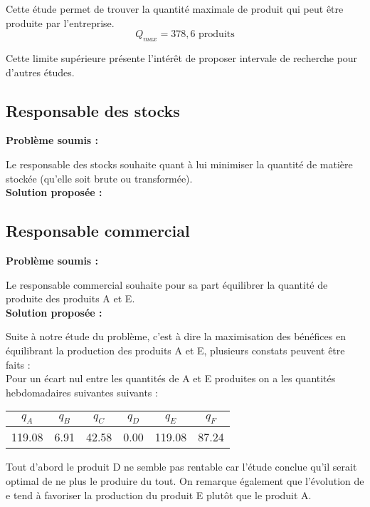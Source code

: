 \documentclass[paper=a4, fontsize=11pt]{scrartcl}
\numberwithin{equation}{section}		%
\numberwithin{figure}{section}			%
\numberwithin{table}{section}				%
\renewcommand{\bf}[1]{\textbf{#1}}
\begin{document}
Cette étude permet de trouver la quantité maximale de produit qui peut être produite par l'entreprise.
\[ Q_{max} = 378,6 \text{ produits}\]

Cette limite supérieure présente l'intérêt de proposer intervale de recherche pour d'autres études.


\subsection{Responsable des stocks}
\bf{Problème soumis :}

Le responsable des stocks souhaite quant à lui minimiser la quantité de matière stockée (qu'elle soit brute ou transformée).\\

\bf{Solution proposée :}

\subsection{Responsable commercial}
\bf{Problème soumis :}

Le responsable commercial souhaite pour sa part équilibrer la quantité de produite des produits A et E.\\

\bf{Solution proposée :}

Suite à notre étude du problème, c'est à dire la maximisation des bénéfices en équilibrant la production des produits A et E, plusieurs constats peuvent être faits :\\
Pour un écart nul entre les quantités de A et E produites on a les quantités hebdomadaires suivantes suivants :
\begin{center}
\begin{tabular}{cccccc}
\hline
$q_A$ & $q_B$ & $q_C$ & $q_D$ & $q_E$ & $q_F$ \\
\hline
119.08 & 6.91 & 42.58 & 0.00 & 119.08 & 87.24 \\
\hline
\end{tabular}
\end{center}
Tout d'abord le produit D ne semble pas rentable car l'étude conclue qu'il serait optimal de ne plus le produire du tout.
On remarque également que l’évolution de e tend à favoriser la production du produit E plutôt que le produit A.
\end{document}
